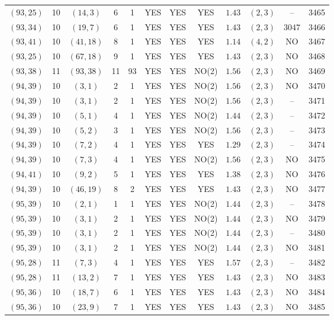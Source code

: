 \begin{longtable}{|c|c|c|c|c|c|c|c|c|c|c|c|}
$(93,25)$ & 10 & $(14,3)$ & 6 & 1 & YES & YES & YES & $1.43$ & $(2,3)$ & -- & 3465\\
$(93,34)$ & 10 & $(19,7)$ & 6 & 1 & YES & YES & YES & $1.43$ & $(2,3)$ & 3047 & 3466\\
$(93,41)$ & 10 & $(41,18)$ & 8 & 1 & YES & YES & YES & $1.14$ & $(4,2)$ & NO & 3467\\
$(93,25)$ & 10 & $(67,18)$ & 9 & 1 & YES & YES & YES & $1.43$ & $(2,3)$ & NO & 3468\\
$(93,38)$ & 11 & $(93,38)$ & 11 & 93 & YES & YES & NO(2) & $1.56$ & $(2,3)$ & NO & 3469\\
$(94,39)$ & 10 & $(3,1)$ & 2 & 1 & YES & YES & NO(2) & $1.56$ & $(2,3)$ & NO & 3470\\
$(94,39)$ & 10 & $(3,1)$ & 2 & 1 & YES & YES & NO(2) & $1.56$ & $(2,3)$ & -- & 3471\\
$(94,39)$ & 10 & $(5,1)$ & 4 & 1 & YES & YES & NO(2) & $1.44$ & $(2,3)$ & -- & 3472\\
$(94,39)$ & 10 & $(5,2)$ & 3 & 1 & YES & YES & NO(2) & $1.56$ & $(2,3)$ & -- & 3473\\
$(94,39)$ & 10 & $(7,2)$ & 4 & 1 & YES & YES & YES & $1.29$ & $(2,3)$ & -- & 3474\\
$(94,39)$ & 10 & $(7,3)$ & 4 & 1 & YES & YES & NO(2) & $1.56$ & $(2,3)$ & NO & 3475\\
$(94,41)$ & 10 & $(9,2)$ & 5 & 1 & YES & YES & YES & $1.38$ & $(2,3)$ & NO & 3476\\
$(94,39)$ & 10 & $(46,19)$ & 8 & 2 & YES & YES & YES & $1.43$ & $(2,3)$ & NO & 3477\\
$(95,39)$ & 10 & $(2,1)$ & 1 & 1 & YES & YES & NO(2) & $1.44$ & $(2,3)$ & -- & 3478\\
$(95,39)$ & 10 & $(3,1)$ & 2 & 1 & YES & YES & NO(2) & $1.44$ & $(2,3)$ & NO & 3479\\
$(95,39)$ & 10 & $(3,1)$ & 2 & 1 & YES & YES & NO(2) & $1.44$ & $(2,3)$ & -- & 3480\\
$(95,39)$ & 10 & $(3,1)$ & 2 & 1 & YES & YES & NO(2) & $1.44$ & $(2,3)$ & NO & 3481\\
$(95,28)$ & 11 & $(7,3)$ & 4 & 1 & YES & YES & YES & $1.57$ & $(2,3)$ & -- & 3482\\
$(95,28)$ & 11 & $(13,2)$ & 7 & 1 & YES & YES & YES & $1.43$ & $(2,3)$ & NO & 3483\\
$(95,36)$ & 10 & $(18,7)$ & 6 & 1 & YES & YES & YES & $1.43$ & $(2,3)$ & NO & 3484\\
$(95,36)$ & 10 & $(23,9)$ & 7 & 1 & YES & YES & YES & $1.43$ & $(2,3)$ & NO & 3485\\

\end{longtable}
